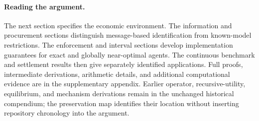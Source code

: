 \paragraph*{Reading the argument.}
The next section specifies the economic environment. The information and procurement sections distinguish message-based identification from known-model restrictions. The enforcement and interval sections develop implementation guarantees for exact and globally near-optimal agents. The continuous benchmark and settlement results then give separately identified applications. Full proofs, intermediate derivations, arithmetic details, and additional computational evidence are in the supplementary appendix. Earlier operator, recursive-utility, equilibrium, and mechanism derivations remain in the unchanged historical compendium; the preservation map identifies their location without inserting repository chronology into the argument.
